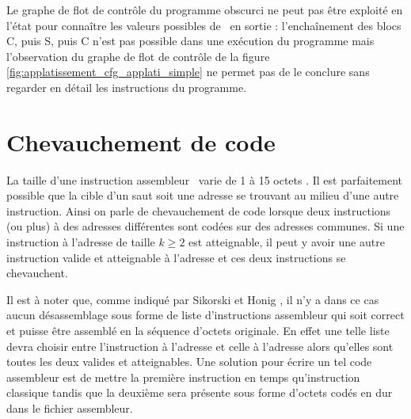 Le graphe de flot de contrôle du programme obscurci ne peut pas être exploité en l'état pour connaître les valeurs possibles de \edi\ en sortie : l'enchaînement des blocs C, puis S, puis C n'est pas possible dans une exécution du programme mais l'observation du graphe de flot de contrôle de la figure \ref{fig:applatissement_cfg_applati_simple} ne permet pas de le conclure sans regarder en détail les instructions du programme.





\section{Chevauchement de code}

La taille d'une instruction assembleur \xq\ varie de 1 à 15 octets \cite{intel_vol2}. 
Il est parfaitement possible que la cible d'un saut soit une adresse se trouvant au milieu d'une autre instruction.
Ainsi on parle de chevauchement de code lorsque deux instructions (ou plus) à des adresses différentes sont codées sur des adresses communes. Si une instruction à l'adresse  de taille $k\geq 2$ est atteignable, il peut y avoir une autre instruction valide et atteignable à l'adresse  et ces deux instructions se chevauchent.

Il est à noter que, comme indiqué par Sikorski et Honig \cite{PMA}, il n'y a dans ce cas aucun désassemblage sous forme de liste d'instructions assembleur qui soit correct et puisse être assemblé en la séquence d'octets originale. En effet une telle liste devra choisir entre l'instruction à l'adresse  et celle à l'adresse  alors qu'elles sont toutes les deux valides et atteignables. Une solution pour écrire un tel code assembleur est de mettre la première instruction en temps qu'instruction classique tandis que la deuxième sera présente sous forme d'octets codés en dur dans le fichier assembleur.

